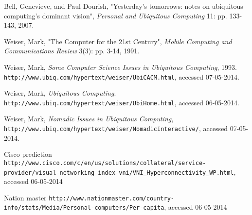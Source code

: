 \begin{thebibliography}{9}

        Bell, Genevieve, and Paul Dourish,
        "Yesterday's tomorrows: notes on ubiquitous computing's dominant vision",
        \emph{Personal and Ubiquitous Computing} 11: pp. 133-143,
        2007.
        
        Weiser, Mark,
        "The Computer for the 21st Century",
        \emph{Mobile Computing and Communications Review} 3(3): pp. 3-14,
        1991.
		
		Weiser, Mark,
		\emph{Some Computer Science Issues in Ubiquitous Computing},
		1993.
		\verb+http://www.ubiq.com/hypertext/weiser/UbiCACM.html+, accessed 07-05-2014.
        
        Weiser, Mark,
        \emph{Ubiquitous Computing}.
        \verb+http://www.ubiq.com/hypertext/weiser/UbiHome.html+, accessed 06-05-2014.
        
		Weiser, Mark,
		\emph{Nomadic Issues in Ubiquitous Computing},
		\verb+http://www.ubiq.com/hypertext/weiser/NomadicInteractive/+, accessed 07-05-2014.
		
        Cisco prediction
        \verb+http://www.cisco.com/c/en/us/solutions/collateral/service-provider/visual-networking-index-vni/VNI_Hyperconnectivity_WP.html+, accessed 06-05-2014
        
        Nation master
        \verb+http://www.nationmaster.com/country-info/stats/Media/Personal-computers/Per-capita+, accessed 06-05-2014
 
\end{thebibliography}